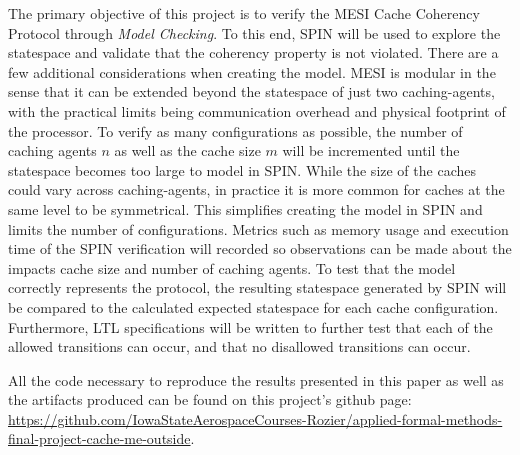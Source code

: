 \documentclass[12pt]{article}
\begin{document}
The primary objective of this project is to verify the MESI Cache Coherency Protocol through \textit{Model Checking}. To this end, SPIN will be used to explore the statespace and validate that the coherency property is not violated. There are a few additional considerations when creating the model. MESI is modular in the sense that it can be extended beyond the statespace of just two caching-agents, with the practical limits being communication overhead and physical footprint of the processor. To verify as many configurations as possible, the number of caching agents $n$ as well as the cache size $m$ will be incremented until the statespace becomes too large to model in SPIN. While the size of the caches could vary across caching-agents, in practice it is more common for caches at the same level to be symmetrical. This simplifies creating the model in SPIN and limits the number of configurations. Metrics such as memory usage and execution time of the SPIN verification will recorded so observations can be made about the impacts cache size and number of caching agents. To test that the model correctly represents the protocol, the resulting statespace generated by SPIN will be compared to the calculated expected statespace for each cache configuration. Furthermore, LTL specifications will be written to further test that each of the allowed transitions can occur, and that no disallowed transitions can occur.

All the code necessary to reproduce the results presented in this paper as well as the artifacts produced can be found on this project's github page: \href{https://github.com/IowaStateAerospaceCourses-Rozier/applied-formal-methods-final-project-cache-me-outside}{https://github.com/IowaStateAerospaceCourses-Rozier/applied-formal-methods-final-project-cache-me-outside}.

\clearpage{
\printbibliography
}
\end{document}
